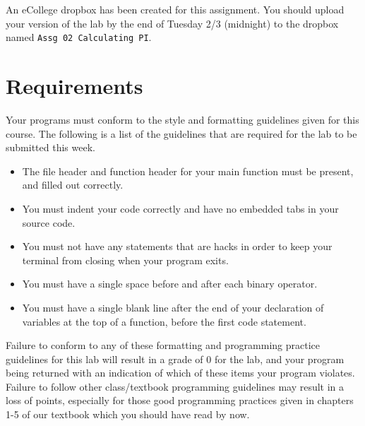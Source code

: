 \documentclass[11pt]{article}
\begin{document}
An eCollege dropbox has been created for this assignment.  You should
upload your version of the lab by the end of Tuesday 2/3 (midnight) to
the dropbox named \verb~Assg 02 Calculating PI~. 
\section*{Requirements}
\label{sec-5}

Your programs must conform to the style and formatting guidelines given for this course.
The following is a list of the guidelines that are required for the lab to be submitted
this week.

\begin{itemize}
\item The file header and function header for your main function must be present, and filled out correctly.
\item You must indent your code correctly and have no embedded tabs in your source code.
\item You must not have any statements that are hacks in order to keep your terminal from closing when your program exits.
\item You must have a single space before and after each binary operator.
\item You must have a single blank line after the end of your declaration
  of variables at the top of a function, before the first code
  statement.
\end{itemize}

Failure to conform to any of these formatting and programming practice
guidelines for this lab will result in a grade of 0 for the lab, and
your program being returned with an indication of which of these items
your program violates.  Failure to follow other class/textbook
programming guidelines may result in a loss of points, especially for
those good programming practices given in chapters 1-5 of our textbook
which you should have read by now.
\end{document}
